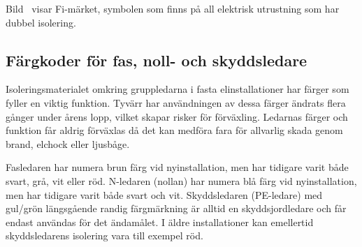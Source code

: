 

Bild~ visar Fi-märket, symbolen som finns på all elektrisk
utrustning som har dubbel isolering.

\subsection{Färgkoder för fas, noll- och skyddsledare}

Isoleringsmaterialet omkring gruppledarna i fasta elinstallationer har
färger som fyller en viktig funktion.
Tyvärr har användningen av dessa färger ändrats flera gånger under årens lopp,
vilket skapar risker för förväxling.
Ledarnas färger och funktion får aldrig förväxlas då det kan medföra fara för
allvarlig skada genom brand, elchock eller ljusbåge.

Fasledaren har numera brun färg vid nyinstallation, men har tidigare varit
både svart, grå, vit eller röd.
N-ledaren (nollan) har numera blå färg vid nyinstallation, men har tidigare
varit både svart och vit.
Skyddsledaren (PE-ledare) med gul/grön längsgående randig färgmärkning är
alltid en skyddsjordledare och får endast användas för det ändamålet.
I äldre installationer kan emellertid skyddsledarens isolering vara till
exempel röd.


